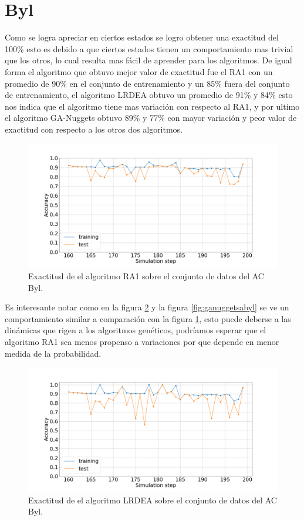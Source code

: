 \section{Byl}

Como se logra apreciar en ciertos estados se logro obtener una exactitud del 100\% esto es debido a que ciertos estados tienen un comportamiento mas trivial que los otros, lo cual resulta mas fácil de aprender para los algoritmos. De igual forma el algoritmo que obtuvo mejor valor de exactitud fue el RA1 con un promedio de 90\% en el conjunto de entrenamiento y un 85\% fuera del conjunto de entrenamiento, el algoritmo LRDEA obtuvo un promedio de 91\% y 84\% esto nos indica que el algoritmo tiene mas variación con respecto al RA1, y por ultimo el algoritmo GA-Nuggets obtuvo 89\% y 77\% con mayor variación y peor valor de exactitud con respecto a los otros dos algoritmos.
\begin{figure}[H]
	\centering
	\includegraphics[width=\linewidth]{fig/ra1_3}
	\caption{Exactitud de el algoritmo RA1 sobre el conjunto de datos del AC Byl.}
	\label{fig:ra1byl}
\end{figure}

Es interesante notar como en la figura \ref{fig:lrdeabyl} y la figura \ref{fig:ganuggetsabyl} se ve un comportamiento similar a comparación con la figura \ref{fig:ra1byl}, esto puede deberse a las dinámicas que rigen a los algoritmos genéticos, podríamos esperar que el algoritmo RA1 sea menos propenso a variaciones por que depende en menor medida de la probabilidad.
\begin{figure}[H]
	\centering
	\includegraphics[width=\linewidth]{fig/LRDEA_4}
	\caption{Exactitud de el algoritmo LRDEA sobre el conjunto de datos del AC Byl.}
	\label{fig:lrdeabyl}
\end{figure}

